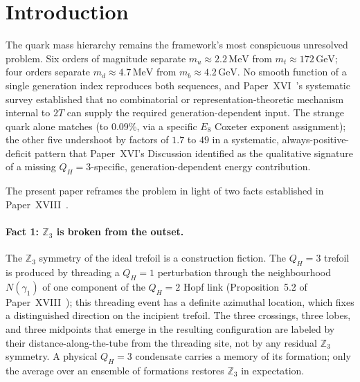 \documentclass[11pt,a4paper]{article}
\theoremstyle{definition}\newtheorem{definition}[theorem]{Definition}
\theoremstyle{remark}
\newcommand{\twoT}{2T}
\newcommand{\QH}{Q_H}
\newcommand{\Zthree}{\mathbb{Z}_3}
\begin{document}
\tableofcontents
\bigskip\newpage

\section{Introduction}
\label{P19:sec:intro}

The quark mass hierarchy remains the framework's most conspicuous
unresolved problem.  Six orders of magnitude separate $m_u\approx
2.2\,\mathrm{MeV}$ from $m_t\approx 172\,\mathrm{GeV}$; four
orders separate $m_d\approx 4.7\,\mathrm{MeV}$ from $m_b\approx
4.2\,\mathrm{GeV}$.  No smooth function of a single generation
index reproduces both sequences, and Paper~XVI~\cite{Paper16}'s
systematic survey established that no combinatorial or
representation-theoretic mechanism internal to $\twoT$ can supply
the required generation-dependent input.  The strange quark alone
matches (to $0.09\%$, via a specific $E_8$ Coxeter exponent
assignment); the other five undershoot by factors of $1.7$ to $49$
in a systematic, always-positive-deficit pattern that Paper~XVI's
Discussion identified as the qualitative signature of a missing
$\QH=3$-specific, generation-dependent energy contribution.

The present paper reframes the problem in light of two facts
established in Paper~XVIII~\cite{Paper18}.

\paragraph{Fact 1: $\Zthree$ is broken from the outset.}  The
$\Zthree$ symmetry of the ideal trefoil is a construction fiction.
The $\QH=3$ trefoil is produced by threading a $\QH=1$ perturbation
through the neighbourhood $N(\gamma_1)$ of one component of the
$\QH=2$ Hopf link (Proposition~5.2 of %
Paper~XVIII~\cite{Paper18}); this threading event has a
definite azimuthal location, which fixes a distinguished direction
on the incipient trefoil.  The three crossings, three lobes, and
three midpoints that emerge in the resulting configuration are
labeled by their distance-along-the-tube from the threading site,
not by any residual $\Zthree$ symmetry.  A physical $\QH=3$
condensate carries a memory of its formation; only the average
over an ensemble of formations restores $\Zthree$ in expectation.
\end{document}
